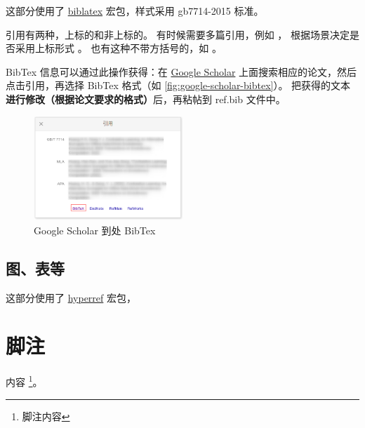 这部分使用了 \href{https://ctan.org/pkg/biblatex}{biblatex} 宏包，样式采用 gb7714-2015 标准。

引用有两种，上标的和非上标的\parencite{he2016deep}。
有时候需要多篇引用，例如 \parencite{he2016deep, krizhevsky2012imagenet, vaswani2017attention}，
根据场景决定是否采用上标形式 。
也有这种不带方括号的，如 \supercite{he2016deep, krizhevsky2012imagenet, vaswani2017attention}。

BibTex 信息可以通过此操作获得：在 \href{https://scholar.google.com}{Google Scholar} 上面搜索相应的论文，然后点击引用，再选择 BibTex 格式（如 \autoref{fig:google-scholar-bibtex}）。
把获得的文本\textbf{进行修改（根据论文要求的格式）}后，再粘帖到 ref.bib 文件中。

\begin{figure}[H]
    \centering
    \caption{Google Scholar 到处 BibTex}
    \label{fig:google-scholar-bibtex}
    \includegraphics[width=0.5\textwidth]{img/google-scholar-bibtex.png}
\end{figure}

\subsection{图、表等}

这部分使用了 \href{https://ctan.org/pkg/hyperref}{hyperref} 宏包，

\section{脚注}

内容 \footnote{脚注内容}。
